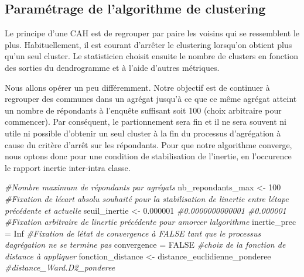 \documentclass[
]{article}
\newenvironment{Shaded}{\begin{snugshade}}{\end{snugshade}}
\newcommand{\CommentTok}[1]{\textcolor[rgb]{0.56,0.35,0.01}{\textit{#1}}}
\newcommand{\ConstantTok}[1]{\textcolor[rgb]{0.00,0.00,0.00}{#1}}
\newcommand{\DecValTok}[1]{\textcolor[rgb]{0.00,0.00,0.81}{#1}}
\newcommand{\FloatTok}[1]{\textcolor[rgb]{0.00,0.00,0.81}{#1}}
\newcommand{\NormalTok}[1]{#1}
\newcommand{\OtherTok}[1]{\textcolor[rgb]{0.56,0.35,0.01}{#1}}
\begin{document}
\hypertarget{paramuxe9trage-de-lalgorithme-de-clustering}{%
\subsection{Paramétrage de l'algorithme de
clustering}\label{paramuxe9trage-de-lalgorithme-de-clustering}}

Le principe d'une CAH est de regrouper par paire les voisins qui se
ressemblent le plus. Habituellement, il est courant d'arrêter le
clustering lorsqu'on obtient plus qu'un seul cluster. Le statisticien
choisit ensuite le nombre de clusters en fonction des sorties du
dendrogramme et à l'aide d'autres métriques.

Nous allons opérer un peu différemment. Notre objectif est de continuer
à regrouper des communes dans un agrégat jusqu'à ce que ce même agrégat
atteint un nombre de répondants à l'enquête suffisant soit 100 (choix
arbitraire pour commencer). Par conséquent, le partionnement sera fin et
il ne sera souvent ni utile ni possible d'obtenir un seul cluster à la
fin du processus d'agrégation à cause du critère d'arrêt sur les
répondants. Pour que notre algorithme converge, nous optons donc pour
une condition de stabilisation de l'inertie, en l'occurence le rapport
inertie inter-intra classe.

\begin{Shaded}
\begin{Highlighting}[]
\CommentTok{\#Nombre maximum de répondants par agrégats}
\NormalTok{nb\_repondants\_max }\OtherTok{\textless{}{-}} \DecValTok{100}
\CommentTok{\#Fixation de l\textquotesingle{}écart absolu souhaité pour la stabilisation de l\textquotesingle{}inertie entre l\textquotesingle{}étape précédente et actuelle}
\NormalTok{seuil\_inertie }\OtherTok{\textless{}{-}} \FloatTok{0.000001} \CommentTok{\#0.0000000000001 \#0.000001}
\CommentTok{\#Fixation arbitraire de l\textquotesingle{}inertie précédente pour amorcer l\textquotesingle{}algorithme}
\NormalTok{inertie\_prec }\OtherTok{=} \ConstantTok{Inf}
\CommentTok{\#Fixation de l\textquotesingle{}état de convergence à FALSE tant que le processus d\textquotesingle{}agrégation ne se termine pas}
\NormalTok{convergence }\OtherTok{=} \ConstantTok{FALSE}
\CommentTok{\#choix de la fonction de distance à appliquer}
\NormalTok{fonction\_distance }\OtherTok{\textless{}{-}}\NormalTok{ distance\_euclidienne\_ponderee }\CommentTok{\#distance\_Ward.D2\_ponderee}
\end{Highlighting}
\end{Shaded}
\end{document}
